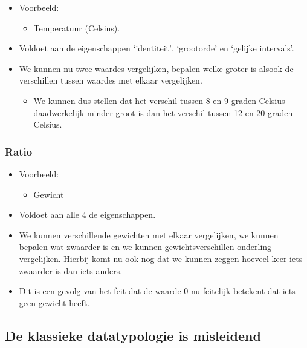 \documentclass[]{tufte-book}
\providecommand{\tightlist}{%
  \setlength{\itemsep}{0pt}\setlength{\parskip}{0pt}}
\begin{document}
\begin{itemize}
\tightlist
\item
  Voorbeeld:

  \begin{itemize}
  \tightlist
  \item
    Temperatuur (Celsius).
  \end{itemize}
\item
  Voldoet aan de eigenschappen `identiteit', `grootorde' en `gelijke intervals'.
\item
  We kunnen nu twee waardes vergelijken, bepalen welke groter is alsook de verschillen tussen waardes met elkaar vergelijken.

  \begin{itemize}
  \tightlist
  \item
    We kunnen dus stellen dat het verschil tussen 8 en 9 graden Celsius daadwerkelijk minder groot is dan het verschil tussen 12 en 20 graden Celsius.
  \end{itemize}
\end{itemize}

\hypertarget{ratio}{%
\subsubsection*{Ratio}\label{ratio}}

\begin{itemize}
\tightlist
\item
  Voorbeeld:

  \begin{itemize}
  \tightlist
  \item
    Gewicht
  \end{itemize}
\item
  Voldoet aan alle 4 de eigenschappen.
\item
  We kunnen verschillende gewichten met elkaar vergelijken, we kunnen bepalen wat zwaarder is en we kunnen gewichtsverschillen onderling vergelijken. Hierbij komt nu ook nog dat we kunnen zeggen hoeveel keer iets zwaarder is dan iets anders.
\item
  Dit is een gevolg van het feit dat de waarde 0 nu feitelijk betekent dat iets geen gewicht heeft.
\end{itemize}

\hypertarget{de-klassieke-datatypologie-is-misleidend}{%
\subsection{De klassieke datatypologie is misleidend}\label{de-klassieke-datatypologie-is-misleidend}}
\end{document}
